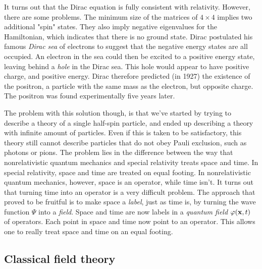 It turns out that the Dirac equation is fully consistent with relativity. However, there are some problems. The minimum size of the matrices of $4\times 4$ implies two additional "spin" states. They also imply negative eigenvalues for the Hamiltonian, which indicates that there is no ground state. Dirac postulated his famous \emph{Dirac sea} of electrons to suggest that the negative energy states are all occupied. An electron in the sea could then be excited to a positive energy state, leaving behind a \emph{hole} in the Dirac sea. This hole would appear to have positive charge, and positive energy. Dirac therefore predicted (in 1927) the existence of the positron, a particle with the same mass as the electron, but opposite charge. The positron was found experimentally five years later.

The problem with this solution though, is that we've started by trying to describe a theory of a single half-spin particle, and ended up describing a theory with infinite amount of particles. Even if this is taken to be satisfactory, this theory still cannot describe particles that do not obey Pauli exclusion, such as photons or pions. The problem lies in the difference between the way that nonrelativistic quantum mechanics and special relativity treats space and time. In special relativity, space and time are treated on equal footing. In nonrelativistic quantum mechanics, however, space is an operator, while time isn't. It turns out that turning time into an operator is a very difficult problem. The approach that proved to be fruitful is to make space a \emph{label}, just as time is, by turning the wave function $\Psi$ into a \emph{field}. Space and time are now labels in a \emph{quantum field} $\varphi(\vb{x},t)$ of operators. Each point in space and time now point to an operator. This allows one to really treat space and time on an equal footing.

\subsection{Classical field theory}
\label{sec:classical-field}

